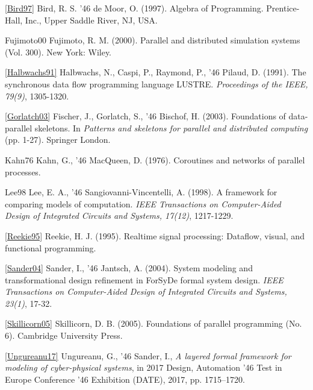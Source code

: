  \href{http://dl.acm.org/citation.cfm?id=248932}{[Bird97]} Bird, R. S. {\char '46} de Moor, O. (1997). Algebra of Programming. Prentice-Hall, Inc., Upper Saddle River, NJ, USA. \par

 {}Fujimoto00{} Fujimoto, R. M. (2000). Parallel and distributed simulation systems (Vol. 300). New York: Wiley.\par

 \href{http://ieeexplore.ieee.org/document/97300/}{[Halbwachs91]} Halbwachs, N., Caspi, P., Raymond, P., {\char '46} Pilaud, D. (1991). The synchronous data flow programming language LUSTRE. \emph{Proceedings of the IEEE, 79(9)}, 1305-1320.\par

 \href{http://link.springer.com/chapter/10.1007/978-1-4471-0097-3_1#page-1}{[Gorlatch03]} Fischer, J., Gorlatch, S., {\char '46} Bischof, H. (2003). Foundations of data-parallel skeletons. In \emph{Patterns and skeletons for parallel and distributed computing} (pp. 1-27). Springer London.\par

 {}Kahn76{} Kahn, G., {\char '46} MacQueen, D. (1976). Coroutines and networks of parallel processes.\par

 {}Lee98{} Lee, E. A., {\char '46} Sangiovanni-Vincentelli, A. (1998). A framework for comparing models of computation. \emph{IEEE Transactions on Computer-Aided Design of Integrated Circuits and Systems, 17(12)}, 1217-1229. \par

 \href{http://ptolemy.eecs.berkeley.edu/~johnr/papers/pdf/thesis.pdf}{[Reekie95]} Reekie, H. J. (1995). Realtime signal processing: Dataflow, visual, and functional programming.\par

 \href{http://people.kth.se/~ingo/Papers/TCAD2004_SystemModeling.pdf}{[Sander04]} Sander, I., {\char '46} Jantsch, A. (2004). System modeling and transformational design refinement in ForSyDe {}formal system design{}. \emph{IEEE Transactions on Computer-Aided Design of Integrated Circuits and Systems, 23(1)}, 17-32.\par

 \href{https://books.google.se/books?hl=ro&lr=&id=rQwsL5xsZigC&oi=fnd&pg=PP1&dq=skillicorn+foundation+parallel+programming&ots=UJMBr0uO2Q&sig=ncyXxE0gFNkUZwVOYyFb_ezWlGY&redir_esc=y#v=onepage&q=skillicorn%20foundation%20parallel%20programming&f=false}{[Skillicorn05]} Skillicorn, D. B. (2005). Foundations of parallel programming (No. 6). Cambridge University Press.\par

 \href{http://ieeexplore.ieee.org/document/7927270/}{[Ungureanu17]} Ungureanu, G., {\char '46} Sander, I., \emph{A layered formal framework for modeling of cyber-physical systems}, in 2017 Design, Automation {\char '46} Test in Europe Conference {\char '46} Exhibition (DATE), 2017, pp. 1715–1720.\par
